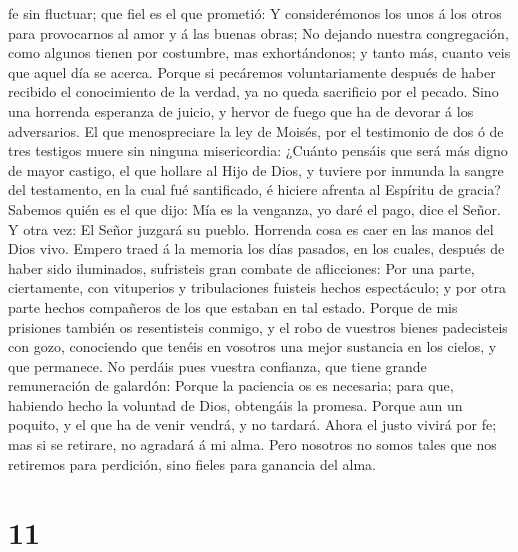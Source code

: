 fe sin fluctuar; que fiel es el que prometió:  Y
considerémonos los unos á los otros para provocarnos al amor y á las
buenas obras;  No dejando nuestra congregación, como
algunos tienen por costumbre, mas exhortándonos; y tanto más, cuanto
veis que aquel día se acerca.  Porque si pecáremos
voluntariamente después de haber recibido el conocimiento de la verdad,
ya no queda sacrificio por el pecado.  Sino una horrenda
esperanza de juicio, y hervor de fuego que ha de devorar á los
adversarios.  El que menospreciare la ley de Moisés, por
el testimonio de dos ó de tres testigos muere sin ninguna misericordia:
 ¿Cuánto pensáis que será más digno de mayor castigo, el
que hollare al Hijo de Dios, y tuviere por inmunda la sangre del
testamento, en la cual fué santificado, é hiciere afrenta al Espíritu de
gracia?  Sabemos quién es el que dijo: Mía es la
venganza, yo daré el pago, dice el Señor. Y otra vez: El Señor juzgará
su pueblo.  Horrenda cosa es caer en las manos del Dios
vivo.  Empero traed á la memoria los días pasados, en los
cuales, después de haber sido iluminados, sufristeis gran combate de
aflicciones:  Por una parte, ciertamente, con vituperios
y tribulaciones fuisteis hechos espectáculo; y por otra parte hechos
compañeros de los que estaban en tal estado.  Porque de
mis prisiones también os resentisteis conmigo, y el robo de vuestros
bienes padecisteis con gozo, conociendo que tenéis en vosotros una mejor
sustancia en los cielos, y que permanece.  No perdáis
pues vuestra confianza, que tiene grande remuneración de galardón:
 Porque la paciencia os es necesaria; para que, habiendo
hecho la voluntad de Dios, obtengáis la promesa.  Porque
aun un poquito, y el que ha de venir vendrá, y no tardará.
 Ahora el justo vivirá por fe; mas si se retirare, no
agradará á mi alma.  Pero nosotros no somos tales que nos
retiremos para perdición, sino fieles para ganancia del alma.

\hypertarget{section-10}{%
\section{11}\label{section-10}}

